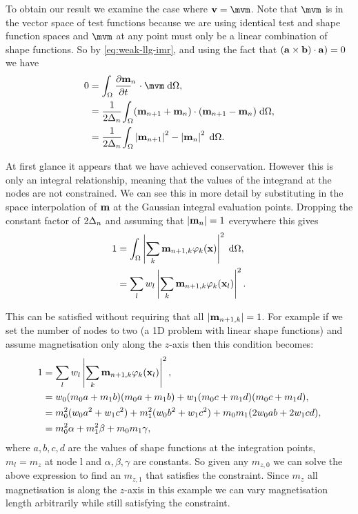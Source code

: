 To obtain our result we examine the case where $\testv = \mvm$.
Note that $\mvm$ is in the vector space of test functions because we are using identical test and shape function spaces and $\mvm$ at any point must only be a linear combination of shape functions.
So by \eqref{eq:weak-llg-imr}, and using the fact that $({\mathbf{a}} \times {\mathbf{b}}) \cdot {\mathbf{a}}) = 0$ we have
\begin{equation}
  \label{eq:23}
  \begin{aligned}
    0 &= \ipg{\dmdtm}{\mvm}, \\
    &= \frac{1}{2\dtn} \intd{(\mv_{n+1} + \mv_{n}) \cdot (\mv_{n+1} - \mv_n)}, \\
    &= \frac{1}{2\dtn} \intd{\abs{\mv_{n+1}}^2 - \abs{\mv_{n}}^2}.
  \end{aligned}
\end{equation}

At first glance it appears that we have achieved conservation. However this is only an integral relationship, meaning that the values of the integrand at the nodes are not constrained.
We can see this in more detail by substituting in the space interpolation of $\mathbf{m}$ at the Gaussian integral evaluation points.
Dropping the constant factor of $2\Delta_{n}$ and assuming that $\left|{\mathbf{m}_n} \right| = 1$ everywhere this gives
\begin{equation}
  \begin{aligned} 
    1 &= {\int_{\Omega} \left|{\sum_k \mathbf{m}_{n+1, k} \varphi_k(\mathbf{x})} \right|^2 {\; \text{d}} {\Omega}}, \\
    &= \sum_l w_l \left|{\sum_k \mathbf{m}_{n+1, k} \varphi_k(\mathbf{x}_l)} \right|^2.
  \end{aligned} 
\end{equation}

This can be satisfied without requiring that all $\left|{\mathbf{m}_{n+1, k}} \right| = 1$.
For example if we set the number of nodes to two (a 1D problem with linear shape functions) and assume magnetisation only along the $z$-axis then this condition becomes:
\begin{equation}
  \begin{aligned}
    1 &= \sum_l w_l \left|{\sum_k \mathbf{m}_{n+1, k} \varphi_k(\mathbf{x}_l)} \right|^2, \\
    &= w_0 (m_0 a + m_1 b)(m_0 a + m_1 b) + w_1 (m_0 c + m_1 d)(m_0 c + m_1 d), \\
    &= m_0^2 (w_0 a^2 + w_1 c^2) + m_1^2 (w_0 b^2 + w_1 c^2) + m_0 m_1 (2w_0ab + 2w_1cd), \\
    &= m_0^2 \alpha + m_1^2 \beta + m_0 m_1 \gamma, \\
  \end{aligned}
\end{equation}
where $a,b,c,d$ are the values of shape functions at the integration points, $m_l = m_{z}$ at node l and $\alpha, \beta, \gamma$ are constants.
So given any $m_{z,0}$ we can solve the above expression to find an $m_{z,1}$ that satisfies the constraint.
Since $m_z$ all magnetisation is along the $z$-axis in this example we can vary magnetisation length arbitrarily while still satisfying the constraint.

